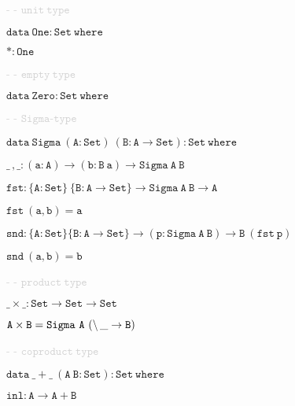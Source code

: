 \vspace{0.25cm}

{\small{\textcolor{lightgray}{- - $\mathtt{unit ~type}$}}}

{\small{$\mathtt{data ~One : Set ~where}$}}

\hspace{0.25cm}
{\small{$\mathtt{* : One}$}}

\vspace{0.25cm}

{\small{\textcolor{lightgray}{- - $\mathtt{empty ~type}$}}}

{\small{$\mathtt{data ~Zero : Set ~where}$}}

\vspace{0.25cm}

{\small{\textcolor{lightgray}{- - $\mathtt{Sigma\text{-}type}$}}}

{\small{$\mathtt{data ~Sigma ~(A : Set) ~(B : A \to Set) : Set ~where}$}}

\hspace{0.25cm}
{\small{$\mathtt{\_\,,\_ : (a : A) \to (b : B ~a) \to Sigma ~A ~B}$}}

\vspace{0.25cm}

{\small{$\mathtt{fst : \{A : Set\} ~\{B : A \to Set\} \to Sigma ~A ~B \to A}$}}

{\small{$\mathtt{fst ~(a , b) = a}$}}

\vspace{0.25cm}

{\small{$\mathtt{snd : \{A : Set\} \{B : A \to Set\} \to (p : Sigma ~A ~B) \to B ~(fst ~p)}$}}

{\small{$\mathtt{snd ~(a , b) = b}$}}

\vspace{0.25cm}

{\small{\textcolor{lightgray}{- - $\mathtt{product ~type}$}}}

{\small{$\mathtt{\_\times\!\_ : Set \to Set \to Set}$}}

{\small{$\mathtt{A \times B = Sigma ~A ~(\char`\\ \, \_ \to B)}$}}

\newpage

{\small{\textcolor{lightgray}{- - $\mathtt{coproduct ~type}$}}}

{\small{$\mathtt{data ~\_+\!\_~ (A ~B : Set) : Set ~where}$}}

\hspace{0.25cm}
{\small{$\mathtt{inl : A \to A + B}$}}

